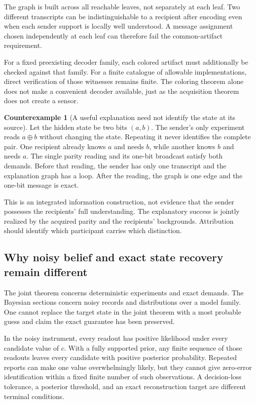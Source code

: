 \documentclass[11pt,letterpaper]{article}
\theoremstyle{plain}
\theoremstyle{definition}
\newtheorem{counterexample}[theorem]{Counterexample}
\begin{document}
The graph is built across all reachable leaves, not separately at each leaf. Two different transcripts can be indistinguishable to a recipient after encoding even when each sender support is locally well understood. A message assignment chosen independently at each leaf can therefore fail the common-artifact requirement.

For a fixed preexisting decoder family, each colored artifact must additionally be checked against that family. For a finite catalogue of allowable implementations, direct verification of those witnesses remains finite. The coloring theorem alone does not make a convenient decoder available, just as the acquisition theorem does not create a sensor.

\begin{counterexample}[A useful explanation need not identify the state at its source]\label{ex:joint-source}
Let the hidden state be two bits $(a,b)$. The sender's only experiment reads $a\oplus b$ without changing the state. Repeating it never identifies the complete pair. One recipient already knows $a$ and needs $b$, while another knows $b$ and needs $a$. The single parity reading and its one-bit broadcast satisfy both demands. Before that reading, the sender has only one transcript and the explanation graph has a loop. After the reading, the graph is one edge and the one-bit message is exact.
\end{counterexample}

This is an integrated information construction, not evidence that the sender possesses the recipients' full understanding. The explanatory success is jointly realized by the acquired parity and the recipients' backgrounds. Attribution should identify which participant carries which distinction.

\subsection{Why noisy belief and exact state recovery remain different}
The joint theorem concerns deterministic experiments and exact demands. The Bayesian sections concern noisy records and distributions over a model family. One cannot replace the target state in the joint theorem with a most probable guess and claim the exact guarantee has been preserved.

In the noisy instrument, every readout has positive likelihood under every candidate value of $c$. With a fully supported prior, any finite sequence of those readouts leaves every candidate with positive posterior probability. Repeated reports can make one value overwhelmingly likely, but they cannot give zero-error identification within a fixed finite number of such observations. A decision-loss tolerance, a posterior threshold, and an exact reconstruction target are different terminal conditions.
\end{document}
